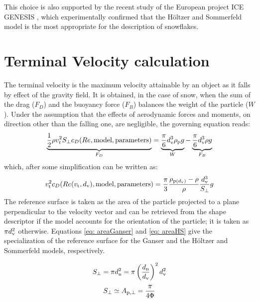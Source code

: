 		This choice is also supported by the recent study of the European project ICE GENESIS , which experimentally confirmed that the H\"oltzer and Sommerfeld model is the most appropriate for the description of snowflakes. 
		
%		
		
	\section{Terminal Velocity calculation}
	\label{sec: terminalVelocity}
		The terminal velocity is the maximum velocity attainable by an object as it falls by effect of the gravity field. It is obtained, in the case of snow, when the sum of the drag ($ F_{D} $) and the buoyancy force ($ F_B $) balances the weight of the particle ($ W $). Under the assumption that the effects of aerodynamic forces and moments, on direction other than the falling one, are negligible, the governing equation reads:
		\begin{equation}
			\underbrace{\frac{1}{2} \rho v_t^2 S_{\perp} c_D(Re, \text{model}, \text{parameters})}_{F_{D}} = 
			\underbrace{\frac{\pi}{6} d_{\textup{v}}^3 \rho_{\textup{p}} g}_{W} - 
			\underbrace{\frac{\pi}{6} d_{\textup{v}}^3 \rho g}_{F_B}
			\label{eq: governing}
		\end{equation}
		which, after some simplification can be written as:
		\begin{equation}
			v_{\textup{t}}^2 c_D(Re(v_{\textup{t}}, d_{\textup{v}}), \text{model}, \text{parameters}) = 
			\frac{\pi}{3} \dfrac{\rho_{\textup{p}(d_{\textup{v}})} - \rho}{\rho} \dfrac{d_{\textup{v}}^3}{S_{\perp}} g
			\label{eq: terminalVelocity}
		\end{equation}
		The reference surface is taken as the area of the particle projected to a plane perpendicular to the velocity vector and can be retrieved from the shape descriptor if the model accounts for the orientation of the particle; it is taken as $ \pi d_{\textup{v}}^2 $ otherwise. Equations \ref{eq: areaGanser} and \ref{eq: areaHS} give the specialization of the reference surface for the Ganser and the H\"oltzer and Sommerfeld models, respectively.
		\begin{multicols}{2}
			\begin{equation}
				S_{\perp} = \pi d_{\textup{n}}^2 = \pi \left( \frac{d_{\textup{n}}}{d_{\textup{v}}} \right)^2 d_{\textup{v}}^2
				\label{eq: areaGanser}
			\end{equation}\break
			\begin{equation}
				S_{\perp} \simeq A_{\textup{p}, \perp} = \dfrac{\pi}{4 \Phi}
				\label{eq: areaHS}
			\end{equation}
		\end{multicols}
		
